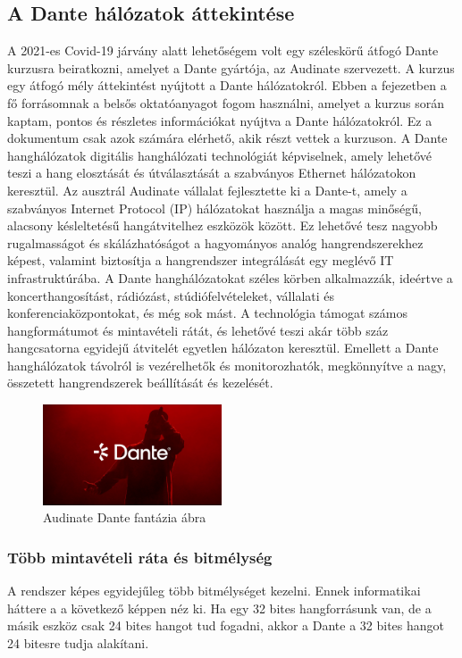 \subsection{A Dante hálózatok áttekintése}
A 2021-es Covid-19 járvány alatt lehetőségem volt egy széleskörű átfogó Dante
kurzusra beiratkozni, amelyet a Dante gyártója, az Audinate szervezett. A kurzus
egy átfogó mély áttekintést nyújtott a Dante hálózatokról. Ebben a fejezetben
a fő forrásomnak a belsős oktatóanyagot fogom használni, amelyet a kurzus
során kaptam, pontos és részletes információkat nyújtva a Dante hálózatokról.
Ez a dokumentum csak azok számára elérhető, akik részt vettek a kurzuson.
A Dante hanghálózatok digitális hanghálózati technológiát képviselnek, amely
lehetővé teszi a hang elosztását és útválasztását a szabványos Ethernet
hálózatokon keresztül. Az ausztrál Audinate vállalat fejlesztette ki a Dante-t,
amely a szabványos Internet Protocol (IP) hálózatokat használja a magas minőségű,
alacsony késleltetésű hangátvitelhez eszközök között. Ez lehetővé tesz
nagyobb rugalmasságot és skálázhatóságot a hagyományos analóg hangrendszerekhez
képest, valamint biztosítja a hangrendszer integrálását egy meglévő IT infrastruktúrába.
A Dante hanghálózatokat széles körben alkalmazzák, ideértve a koncerthangosítást,
rádiózást, stúdiófelvételeket, vállalati és konferenciaközpontokat, és még sok mást.
A technológia támogat számos hangformátumot és mintavételi rátát, és lehetővé
teszi akár több száz hangcsatorna egyidejű átvitelét egyetlen hálózaton keresztül.
Emellett a Dante hanghálózatok távolról is vezérelhetők és monitorozhatók,
megkönnyítve a nagy, összetett hangrendszerek beállítását és kezelését.
\begin{figure}[H]
	\centering
	\includegraphics[width=200px, keepaspectratio]{figures/dante_visual.jpg}
	\caption{Audinate Dante fantázia ábra}
	\label {fig:dante_visual}
\end{figure}
\subsubsection{Több mintavételi ráta és bitmélység}
A rendszer képes egyidejűleg több bitmélységet kezelni. Ennek informatikai háttere a
a következő képpen néz ki. Ha egy 32 bites hangforrásunk van, de a másik eszköz
csak 24 bites hangot tud fogadni, akkor a Dante a 32 bites hangot 24 bitesre tudja 
alakítani.

